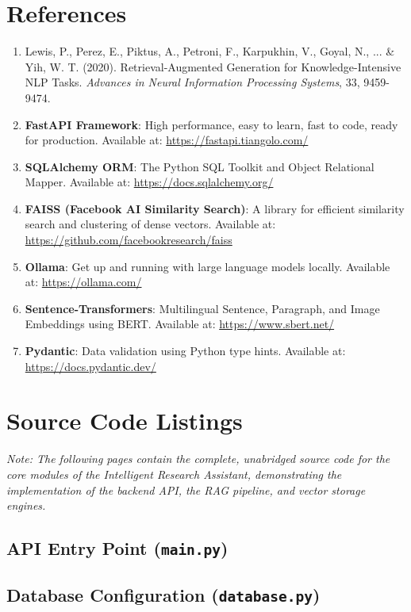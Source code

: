 \documentclass[12pt, a4paper]{report}
\begin{document}
\chapter*{References}
\begin{enumerate}
    \item Lewis, P., Perez, E., Piktus, A., Petroni, F., Karpukhin, V., Goyal, N., ... \& Yih, W. T. (2020). Retrieval-Augmented Generation for Knowledge-Intensive NLP Tasks. \textit{Advances in Neural Information Processing Systems}, 33, 9459-9474.
    \item \textbf{FastAPI Framework}: High performance, easy to learn, fast to code, ready for production. Available at: \url{https://fastapi.tiangolo.com/}
    \item \textbf{SQLAlchemy ORM}: The Python SQL Toolkit and Object Relational Mapper. Available at: \url{https://docs.sqlalchemy.org/}
    \item \textbf{FAISS (Facebook AI Similarity Search)}: A library for efficient similarity search and clustering of dense vectors. Available at: \url{https://github.com/facebookresearch/faiss}
    \item \textbf{Ollama}: Get up and running with large language models locally. Available at: \url{https://ollama.com/}
    \item \textbf{Sentence-Transformers}: Multilingual Sentence, Paragraph, and Image Embeddings using BERT. Available at: \url{https://www.sbert.net/}
    \item \textbf{Pydantic}: Data validation using Python type hints. Available at: \url{https://docs.pydantic.dev/}
\end{enumerate}

\appendix
\chapter{Source Code Listings}
\textit{Note: The following pages contain the complete, unabridged source code for the core modules of the Intelligent Research Assistant, demonstrating the implementation of the backend API, the RAG pipeline, and vector storage engines.}

\section{API Entry Point (\texttt{main.py})}


\section{Database Configuration (\texttt{database.py})}

\end{document}
